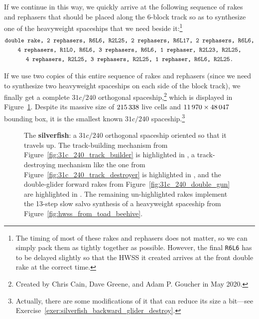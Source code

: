 If we continue in this way, we quickly arrive at the following sequence of rakes and rephasers that should be placed along the $6$-block track so as to synthesize one of the heavyweight spaceships that we need beside it:\footnote{The timing of most of these rakes and rephasers does not matter, so we can simply pack them as tightly together as possible. However, the final \texttt{R6L6} has to be delayed slightly so that the HWSS it created arrives at the front double rake at the correct time.}\label{page:silverfish_rake_seq}
\begin{gather*}
	\text{\texttt{double rake, 2 rephasers, R6L6, R2L25, 2 rephasers, R6L17, 2 rephasers, R6L6,}} \\
	\text{\texttt{4 rephasers, R1L0, R6L6, 3 rephasers, R6L6, 1 rephaser, R2L23, R2L25,}} \\
	\text{\texttt{4 rephasers, R2L25, 3 rephasers, R2L25, 1 rephaser, R6L6, R2L25.}}
\end{gather*}

If we use two copies of this entire sequence of rakes and rephasers (since we need to synthesize two heavyweight spaceships on each side of the block track), we finally get a complete $31c/240$ orthogonal spaceship,\footnote{Created by Chris Cain, Dave Greene, and Adam P. Goucher in May 2020.} which is displayed in Figure~\ref{fig:silverfish}. Despite its massive size of $215{\,}338$ live cells and $11{\,}970 \times 48{\,}047$ bounding box, it is the smallest known $31c/240$ spaceship.\footnote{Actually, there are some modifications of it that can reduce its size a bit---see Exercise~\ref{exer:silverfish_backward_glider_destroy}.}

\begin{figure}[!htbp]
	\centering
	\caption{The \textbf{silverfish}: a $31c/240$ orthogonal spaceship oriented so that it travels up. The track-building mechanism from Figure~\ref{fig:31c_240_track_builder} is highlighted in , a track-destroying mechanism like the one from Figure~\ref{fig:31c_240_track_destroyer} is highlighted in , and the double-glider forward rakes from Figure~\ref{fig:31c_240_double_gun} are highlighted in . The remaining un-highlighted rakes implement the 13-step slow salvo synthesis of a heavyweight spaceship from Figure~\ref{fig:hwss_from_toad_beehive}.}\label{fig:silverfish}
\end{figure}



